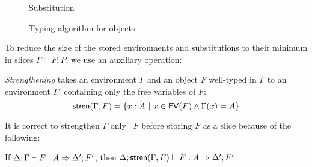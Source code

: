 \documentclass{llncs}
\begin{document}
\begin{figure}
\begin{mathpar}
  \end{mathpar}

  \qquad
  {Substitution}

  \begin{mathpar}



  \end{mathpar}

  \caption{Typing algorithm for objects}
  \label{fig:obj-typing}
\end{figure}

To reduce the size of the stored environments and substitutions to
their minimum in slices $\Gamma\vdash F : P$, we use an auxiliary
operation:

\begin{definition}
  \emph{Strengthening} takes an environment $\Gamma$ and an object $F$
  well-typed in $\Gamma$ to an environment $\Gamma'$ containing only
  the free variables of $F$:
$$
\stren{\Gamma,F} = \{x : A\ |\ x\in \FV{F} \wedge \Gamma(x)=A\}
$$
\end{definition}

It is correct to strengthen $\Gamma$ only \wrt\ $F$ before storing $F$
as a slice because of the following:

\begin{lemma}
  If $\jm\Delta\Gamma F A {\Delta'} {F'}$, then
  $\jm\Delta{\stren{\Gamma, F}} F A {\Delta'}{F'}$
\end{lemma}




\end{document}
